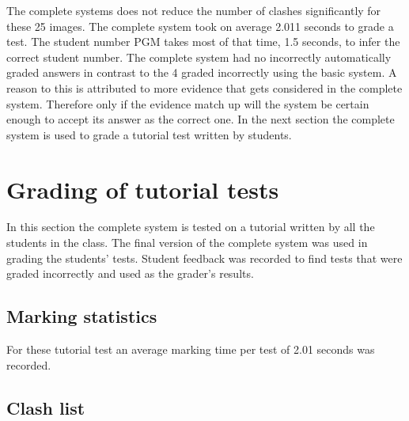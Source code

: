 The complete systems does not reduce the number of clashes significantly for these 25 images. The complete system took on average 2.011 seconds to grade a test. The student number PGM takes most of that time, 1.5 seconds, to infer the correct student number. The complete system had no incorrectly automatically graded answers in contrast to the 4 graded incorrectly using the basic system. A reason to this is attributed to more evidence that gets considered in the complete system. Therefore only if the evidence match up will the system be certain enough to accept its answer as the correct one. In the next section the complete system is used to grade a tutorial test written by students. 

\section{Grading of tutorial tests}
In this section the complete system is tested on a tutorial written by all the students in the class. The final version of the complete system was used in grading the students' tests. Student feedback was recorded to find tests that were graded incorrectly and used as the grader's results. 

\subsection{Marking statistics}

For these tutorial test an average marking time per test of 2.01 seconds was recorded.

\subsection{Clash list}

